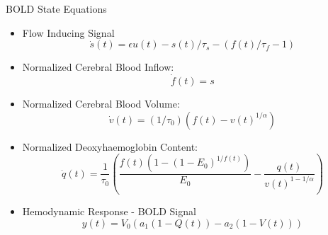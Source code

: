 \documentclass{beamer}
\begin{document}
\begin{frame}{BOLD State Equations}
  \begin{itemize}
    \item Flow Inducing Signal
    $$\dot{s}(t) = \epsilon u(t) - s(t)/\tau_s - (f(t)/\tau_f - 1)$$
    \item Normalized Cerebral Blood Inflow:
    $$\dot{f}(t) = s $$
    \item Normalized Cerebral Blood Volume:
    $$\dot{v}(t) = (1/\tau_0)( f(t) - v(t) ^ {1/\alpha}) $$
    \item Normalized Deoxyhaemoglobin Content:\\
    $$\dot{q}(t) = \frac{1}{\tau_0}\left(\frac{f(t)(1-(1-E_0)^{1/f(t)})}{E_0} -
            \frac{q(t)}{v(t)^{1-1/\alpha}}\right)$$
    \item Hemodynamic Response - BOLD Signal
    $$y(t) = V_0(a_1( 1 - Q(t)) - a_2(1 - V(t)))$$
  \end{itemize}
\end{frame}
\end{document}
